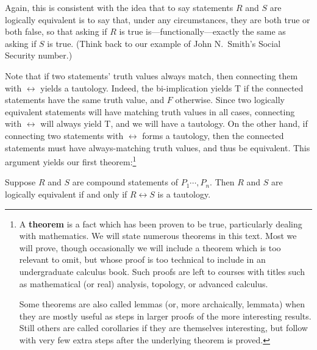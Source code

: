 Again, this is consistent with the idea that to say
statements $R$ and $S$ are logically equivalent is to 
say that, under any circumstances, they are both
true or both false, so that asking if $R$ is true
is---functionally---exactly the same as asking if $S$ is true.
(Think back to our example of John N.\  Smith's Social Security number.)

Note that if two statements' truth values always match, then
connecting them with $\longleftrightarrow$ yields a 
tautology.  Indeed, the bi-implication yields T if the connected
statements have the same truth value, and $F$ otherwise.
Since two logically equivalent statements will 
have matching truth values in all cases, 
connecting with $\longleftrightarrow$
will always yield T, and we will have a tautology.  
On the other hand, if 
connecting two statements with $\longleftrightarrow$
forms a tautology, then the connected statements must
have always-matching truth values, and thus be equivalent.
This argument yields our first theorem:\footnote{%
A {\bf theorem} is a fact which has been proven to be true, 
particularly dealing with mathematics.  We will state 
numerous theorems in this text.  Most we will prove,
though occasionally we will include a theorem which
is too relevant to omit, but whose proof is  too technical
to include in an undergraduate calculus book.  Such 
proofs are left to courses with titles such as
mathematical (or real) analysis, topology, or advanced calculus.

Some theorems are also called lemmas (or, more archaically,
lemmata) when they are mostly useful as steps in larger
proofs of the more interesting results.  Still others
are called corollaries if they are themselves interesting, but
follow with very few extra steps after the 
underlying theorem is proved.
}

\begin{theorem}
Suppose $R$ and $S$ are compound statements of $P_1\cdots,P_n$.
Then $R$ and $S$ are logically equivalent if and only if
$R\longleftrightarrow S$ is a tautology.
\end{theorem}

